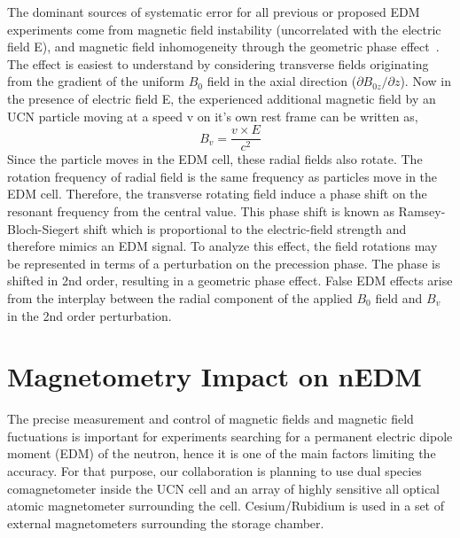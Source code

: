 The dominant sources of systematic error for all previous or proposed
EDM experiments come from magnetic field instability (uncorrelated
with the electric field E), and magnetic field inhomogeneity through
the geometric phase effect~\cite{PhysRevA.70.032102}.  The effect is
easiest to understand by considering transverse fields originating
from the gradient of the uniform $B_0$ field in the axial direction
($\partial B_{0z}/{\partial z}$).  Now in the presence of electric
field E, the experienced additional magnetic field by an UCN particle
moving at a speed v on it’s own rest frame can be written as,
\begin{equation}
  B_v=\frac{v\times E}{c^2}
  \label{equation:phase effect}
\end{equation}
Since the particle moves in the EDM cell, these radial fields also
rotate. The rotation frequency of radial field is the same frequency
as particles move in the EDM cell.  Therefore, the transverse rotating
field induce a phase shift on the resonant frequency from the central
value.  This phase shift is known as Ramsey-Bloch-Siegert shift which
is proportional to the electric-field strength and therefore mimics an
EDM signal.  To analyze this effect, the field rotations may be
represented in terms of a perturbation on the precession phase. The
phase is shifted in 2nd order, resulting in a geometric phase effect.
False EDM effects arise from the interplay between the radial
component of the applied $B_0$ field and $B_v$ in the 2nd order
perturbation.

\section{ Magnetometry Impact on nEDM}
The precise measurement and control of magnetic fields and magnetic field fuctuations is important for experiments searching for a permanent electric dipole moment (EDM) of the neutron, hence it is one of the main factors limiting the accuracy.  For that purpose, our collaboration
is planning to use dual species comagnetometer inside the UCN cell and
an array of highly sensitive all optical atomic magnetometer
surrounding the cell. Cesium/Rubidium is used in a set of external
magnetometers surrounding the storage chamber.

